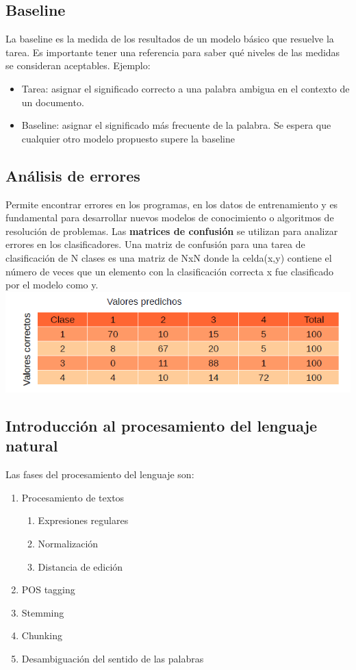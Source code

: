 \documentclass{ctexart}
\begin{document}
	\subsection{Baseline}
	\begin{flushleft}
		La baseline es la medida de los resultados de un modelo básico que resuelve la tarea. Es importante tener una referencia para saber qué niveles de las medidas se consideran aceptables.
		Ejemplo:
		\begin{itemize}
			\item Tarea: asignar el significado correcto a una palabra ambigua en el contexto de un documento.
			\item Baseline: asignar el significado más frecuente de la palabra.	Se espera que cualquier otro modelo propuesto supere la baseline
		\end{itemize}
	\end{flushleft}
	\subsection{Análisis de errores}
	\begin{flushleft}
		Permite encontrar errores en los programas, en los datos de entrenamiento y es fundamental para desarrollar nuevos modelos de conocimiento o algoritmos de resolución de problemas.
		Las \textbf{matrices de confusión} se utilizan para analizar errores en los clasificadores. Una matriz de confusión para una tarea de clasificación de N clases es una matriz de NxN
		donde la celda(x,y) contiene el número de veces que un elemento con la clasificación correcta x fue clasificado por el modelo como y.
		\includegraphics[scale=0.75]{errores}
	\end{flushleft}
	\subsection{Introducción al procesamiento del lenguaje natural}
	\begin{flushleft}
	Las fases del procesamiento del lenguaje son:
	\begin{enumerate}
		\item Procesamiento de textos
		\begin{enumerate}
			\item Expresiones regulares
			\item Normalización
			\item Distancia de edición
		\end{enumerate}
		\item POS tagging
		\item Stemming
		\item Chunking
		\item Desambiguación del sentido de las palabras
	\end{enumerate}
	\end{flushleft}
\end{document}

